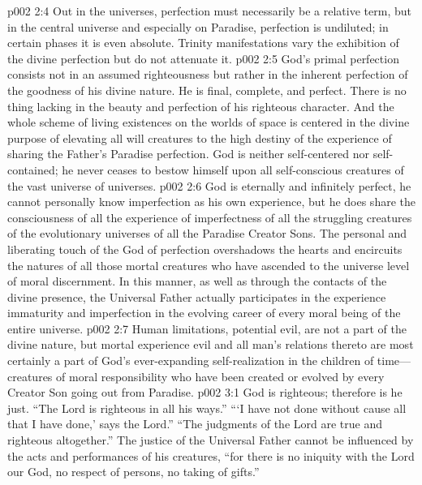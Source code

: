 \vs p002 2:4 Out in the universes, perfection must necessarily be a relative term, but in the central universe and especially on Paradise, perfection is undiluted; in certain phases it is even absolute. Trinity manifestations vary the exhibition of the divine perfection but do not attenuate it.
\pc \vs p002 2:5 God’s primal perfection consists not in an assumed righteousness but rather in the inherent perfection of the goodness of his divine nature. He is final, complete, and perfect. There is no thing lacking in the beauty and perfection of his righteous character. And the whole scheme of living existences on the worlds of space is centered in the divine purpose of elevating all will creatures to the high destiny of the experience of sharing the Father’s Paradise perfection. God is neither self\hyp{}centered nor self\hyp{}contained; he never ceases to bestow himself upon all self\hyp{}conscious creatures of the vast universe of universes.
\vs p002 2:6 God is eternally and infinitely perfect, he cannot personally know imperfection as his own experience, but he does share the consciousness of all the experience of imperfectness of all the struggling creatures of the evolutionary universes of all the Paradise Creator Sons. The personal and liberating touch of the God of perfection overshadows the hearts and encircuits the natures of all those mortal creatures who have ascended to the universe level of moral discernment. In this manner, as well as through the contacts of the divine presence, the Universal Father actually participates in the experience  immaturity and imperfection in the evolving career of every moral being of the entire universe.
\vs p002 2:7 Human limitations, potential evil, are not a part of the divine nature, but mortal experience  evil and all man’s relations thereto are most certainly a part of God’s ever\hyp{}expanding self\hyp{}realization in the children of time---creatures of moral responsibility who have been created or evolved by every Creator Son going out from Paradise.\plusone
{}
\vs p002 3:1 God is righteous; therefore is he just. “The Lord is righteous in all his ways.” “‘I have not done without cause all that I have done,’ says the Lord.” “The judgments of the Lord are true and righteous altogether.” The justice of the Universal Father cannot be influenced by the acts and performances of his creatures, “for there is no iniquity with the Lord our God, no respect of persons, no taking of gifts.”
